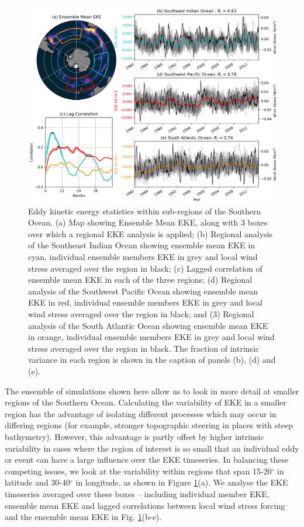 \documentclass{agujournal2019}
\begin{document}
\begin{figure}[t]
\begin{center}
\includegraphics[width=\hsize]{Figure3}
\caption{Eddy kinetic energy statistics within sub-regions of the Southern Ocean. (a) Map showing Ensemble Mean EKE, along with 3 boxes over which a regional EKE analysis is applied; (b) Regional analysis of the Southeast Indian Ocean showing ensemble mean EKE in cyan, individual ensemble members EKE in grey and local wind stress averaged over the region in black; (c) Lagged correlation of ensemble mean EKE in each of the three regions; (d) Regional analysis of the Southwest Pacific Ocean showing ensemble mean EKE in red, individual ensemble members EKE in grey and local wind stress averaged over the region in black; and (3) Regional analysis of the South Atlantic Ocean showing ensemble mean EKE in orange, individual ensemble members EKE in grey and local wind stress averaged over the region in black. The fraction of intrinsic variance in each region is shown in the caption of panels (b), (d) and (e).}
\label{Fig:3}
\end{center}
\end{figure}

The ensemble of simulations shown here allow us to look in more detail at smaller regions of the Southern Ocean.
Calculating the variability of EKE in a smaller region has the advantage of isolating different processes which may occur in differing regions (for example, stronger topographic steering in places with steep bathymetry).
However, this advantage is partly offset by higher intrinsic variability in cases where the region of interest is so small that an individual eddy or event can have a large influence over the EKE timeseries.
In balancing these competing issues, we look at the variability within regions that span 15-20$^\circ$ in latitude and 30-40$^\circ$ in longitude, as shown in Figure \ref{Fig:3}(a).
We analyse the EKE timeseries averaged over these boxes -- including individual member EKE, ensemble mean EKE and lagged correlations between local wind stress forcing and the ensemble mean EKE in Fig. \ref{Fig:3}(b-e).
\end{document}
